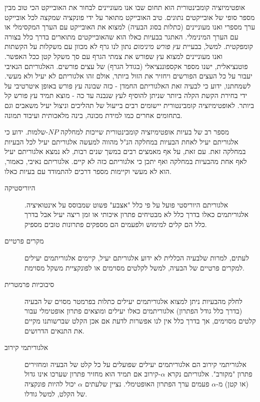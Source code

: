 \begin{hebrew}
אופטימיזציה קומבינטורית הוא תחום שבו אנו מעוניינים לבחור את האובייקט הכי טוב מבין מספר סופי של אובייקטים נתונים.
טיב האובייקט מתואר על ידי פונקציה שמקצה לכל אובייקט ערך מספרי ואנו מעוניינים (כתלות בסוג הבעיה) למצוא את האובייקט עם הערך המקסימלי או עם הערך המינימלי.
האתגר בבעיות כאלו הוא שהאובייקטים מתוארים בדרך כלל בצורה קומפקטית.
למשל, בבעיית
\emph{עץ פורש מינימום}
נתון לנו גרף לא מכוון עם משקלות על הקשתות ואנו מעוניינים למצוא עץ שפורש את צמתי הגרף עם סך משקל קטן ככל האפשר.
פוטנציאלית, ישנו מספר אקספוננציאלי (בגודל הגרף) של עצים פורשים.
האלגוריתם הנאיבי יעבור על כל העצים הפורשים ויחזיר את הזול ביותר, אולם זהו אלגוריתם לא יעיל ולא מעשי.
לשמחתנו, ידוע כי לבעיה זאת האלגוריתם החמדן - כזה שבונה עץ פורש באופן איטרטיבי על ידי בחירת הקשת הקלה ביותר שניתן להוסיף לעץ שנבנה עד כה - מוצא תמיד עץ פורש קל ביותר.
לאופטימיזציה קומבינטורית יישומים רבים בייעול של תהליכים וניצול יעיל משאבים וגם בתחומים אחרים כמו למידת מכונה, בינה מלאכותית ועיבוד תמונה.

מספר רב של בעיות אופטימיזציה קומבינטורית שייכות למחלקה $NP$-שלמות.
ידוע כי אלגוריתם יעיל לאחת הבעיות במחלקה הנ"ל מהווה למעשה אלגוריתם יעיל לכל הבעיות במחלקה זאת.
עם זאת, על אף מאמצים רבים במשך שנים רבות, לא נמצא אלגוריתם יעיל לאף אחת מהבעיות במחלקה ואף יתכן כי אלגוריתם כזה לא קיים.
אלגוריתם נאיבי, כאמור, הוא לא מעשי וקיימות מספר דרכים להתמודד עם בעיות כאלו.

\begin{description}
\item[\texthebrew{היוריסטיקה}]
אלגוריתם היוריסטי פועל על פי כלל "אצבע" פשוט שמבוסס על אינטואיציה.
אלגוריתמים כאלו בדרך כלל לא מבטיחים פתרון איכותי או זמן ריצה יעיל אבל בדרך כלל הם קלים למימוש ולפעמים הם מספקים פתרונות טובים מספיק.
\item[\texthebrew{מקרים פרטיים}]
לעתים, למרות שלבעיה הכללית לא ידוע אלגוריתם יעיל, קיימים אלגוריתמים יעילים למקרים פרטיים של הבעיה, למשל לקלטים מסוימים או לפונקציית משקל מסוימת.
\item[\texthebrew{סיבוכיות פרמטרית}]
לחלק מהבעיות ניתן למצוא אלגוריתמים יעילים כתלות בפרמטר מסוים של הבעיה (בדרך כלל גודל הפתרון) אלגוריתמים כאלו יעילים ומוצאים פתרון אופטימלי עבור קלטים מסוימים,
אך בדרך כלל אין לנו אפשרות לדעת אם אכן הקלט שברשותנו מקיים את התנאים הדרושים.
\item[\texthebrew{אלגוריתמי קירוב}]
אלגוריתמי קירוב הם אלגוריתמים יעילים שפועלים על כל קלט של הבעיה ומחזירים פתרון "מקורב".
אלגוריתם נקרא $\alpha$-קירוב אם תמיד הוא מחזיר פתרון שערכו אינו גדול (או קטן) מ-$\alpha$ פעמים ערך הפתרון האופטימלי.
נציין שלעתים $\alpha$ יכול להיות פונקציה של הקלט, למשל גודלו.
\end{description}


\end{hebrew}
